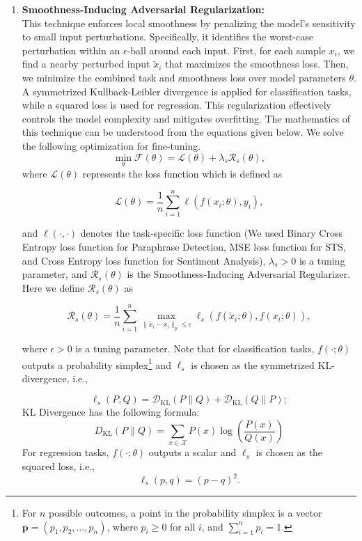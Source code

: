 \begin{enumerate}
  \item \textbf{Smoothness-Inducing Adversarial Regularization:} \\[0.5em]
  This technique enforces local smoothness by penalizing the model's sensitivity to small input perturbations. Specifically, it identifies the worst-case perturbation within an $\epsilon$-ball around each input. First, for each sample \( x_i \), we find a nearby perturbed input \( \tilde{x}_i \) that maximizes the smoothness loss. Then, we minimize the combined task and smoothness loss over model parameters \( \theta \).  A symmetrized Kullback-Leibler divergence is applied for classification tasks, while a squared loss is used for regression. This regularization effectively controls the model complexity and mitigates overfitting. The mathematics of this technique can be understood from the equations given below. We solve the following optimization for fine-tuning.
    \[
    \min_{\theta} \mathcal{F}(\theta) = \mathcal{L}(\theta) + \lambda_s \mathcal{R}_s(\theta),
    \]
    where $\mathcal{L}(\theta)$ represents the loss function which is defined as

    \[
    \mathcal{L}(\theta) = \frac{1}{n} \sum_{i=1}^{n} \ell(f(x_i; \theta), y_i),
    \]

    and $\ell(\cdot, \cdot)$ denotes the task-specific loss function (We used Binary Cross Entropy loss function for Paraphrase Detection, MSE loss function for STS, and Cross Entropy loss function for Sentiment Analysis), $\lambda_s > 0$ is a tuning parameter, and $\mathcal{R}_s(\theta)$ is the Smoothness-Inducing Adversarial Regularizer. Here we define $\mathcal{R}_s(\theta)$ as

    \[
    \mathcal{R}_s(\theta) = \frac{1}{n} \sum_{i=1}^{n} \max_{\|\tilde{x}_i - x_i\|_p \leq \epsilon} \ell_s(f(\tilde{x}_i; \theta), f(x_i; \theta)),
    \]

    where $\epsilon > 0$ is a tuning parameter. Note that for classification tasks, $f(\cdot; \theta)$ outputs a probability simplex\footnote{For \( n \) possible outcomes, a point in the probability simplex is a vector \( \mathbf{p} = (p_1, p_2, \dots, p_n) \), where \( p_i \geq 0 \) for all \( i \), and \( \sum_{i=1}^{n} p_i = 1 \).} and $\ell_s$ is chosen as the symmetrized KL-divergence, i.e.,

    \[
    \ell_s(P, Q) = \mathcal{D}_{\mathrm{KL}}(P \| Q) + \mathcal{D}_{\mathrm{KL}}(Q \| P);
    \]
    KL Divergence has the following formula:
    \[
    D_{\mathrm{KL}}(P \parallel Q) = \sum_{x \in \mathcal{X}} P(x) \log \left( \frac{P(x)}{Q(x)} \right)
    \]
    For regression tasks, $f(\cdot; \theta)$ outputs a scalar and $\ell_s$ is chosen as the squared loss, i.e.,
    \[
    \ell_s(p, q) = (p - q)^2.
    \]


\end{enumerate}
